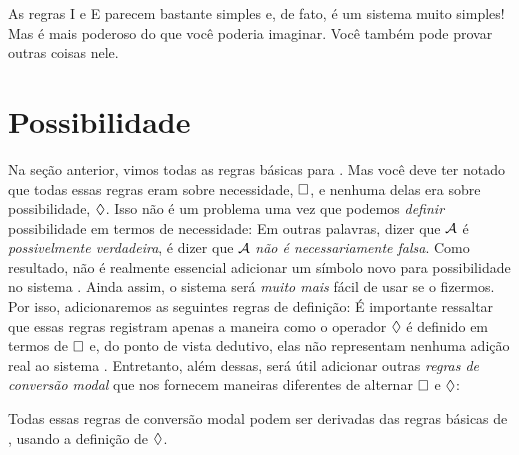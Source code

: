 As regras \ebox I e \ebox E parecem bastante simples e, de fato, \mlK{} é um sistema muito simples! Mas \mlK{} é mais poderoso do que você poderia imaginar. Você também pode  provar outras coisas nele.

\section{Possibilidade}
\label{possibility}

Na seção anterior, vimos todas as regras básicas para \mlK. Mas você deve ter notado que todas essas regras eram sobre necessidade,  $\Box$, e nenhuma delas era sobre possibilidade, $\Diamond$. Isso não é um problema uma vez que podemos \emph{definir} possibilidade em termos de necessidade:
Em outras palavras, dizer que $\mathcal{A}$ é \emph{possivelmente verdadeira}, é dizer que $\mathcal{A}$   \emph{não é necessariamente falsa}. Como resultado, não é realmente essencial adicionar um símbolo novo para possibilidade  no sistema \mlK. Ainda assim, o sistema será \emph{muito mais} fácil de usar se o fizermos. Por isso, adicionaremos as seguintes regras de definição:
É importante ressaltar que essas regras registram apenas a maneira como  o operador $\Diamond$  é definido em termos de $\Box$ e, do ponto de vista dedutivo, elas não representam nenhuma adição real ao sistema \mlK. Entretanto, além dessas,  será útil adicionar outras \emph{regras de conversão modal} que nos fornecem maneiras  diferentes de alternar  $\Box$  e $\Diamond$:
 

Todas essas regras de conversão modal podem ser derivadas das regras básicas de \mlK, usando a  definição de $\Diamond$. 


